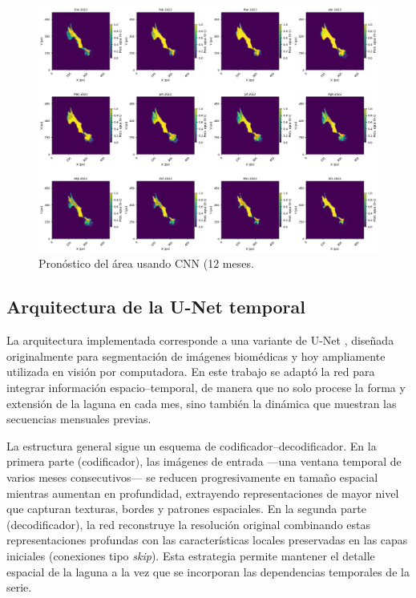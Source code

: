 \begin{figure}[H]
    \centering
    \includegraphics[scale=0.30]{Figures/forecast_cnn.png}
    \caption{Pronóstico del área usando CNN (12 meses.}
    \label{fig:forecast_cnn}
\end{figure}

\subsection{Arquitectura de la U-Net temporal}

La arquitectura implementada corresponde a una variante de U-Net \parencite{ronneberger2015unet}, diseñada originalmente para segmentación de imágenes biomédicas y hoy ampliamente utilizada en visión por computadora. En este trabajo se adaptó la red para integrar información espacio--temporal, de manera que no solo procese la forma y extensión de la laguna en cada mes, sino también la dinámica que muestran las secuencias mensuales previas.

La estructura general sigue un esquema de codificador--decodificador. En la primera parte (codificador), las imágenes de entrada ---una ventana temporal de varios meses consecutivos--- se reducen progresivamente en tamaño espacial mientras aumentan en profundidad, extrayendo representaciones de mayor nivel que capturan texturas, bordes y patrones espaciales. En la segunda parte (decodificador), la red reconstruye la resolución original combinando estas representaciones profundas con las características locales preservadas en las capas iniciales (conexiones tipo \emph{skip}). Esta estrategia permite mantener el detalle espacial de la laguna a la vez que se incorporan las dependencias temporales de la serie.

